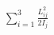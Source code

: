\documentclass[preview]{standalone}
\begin{document}
\begin{align*}
\sum_{i=1}^3\frac{L_{ij}^2}{2I_j}
\end{align*}
\end{document}
